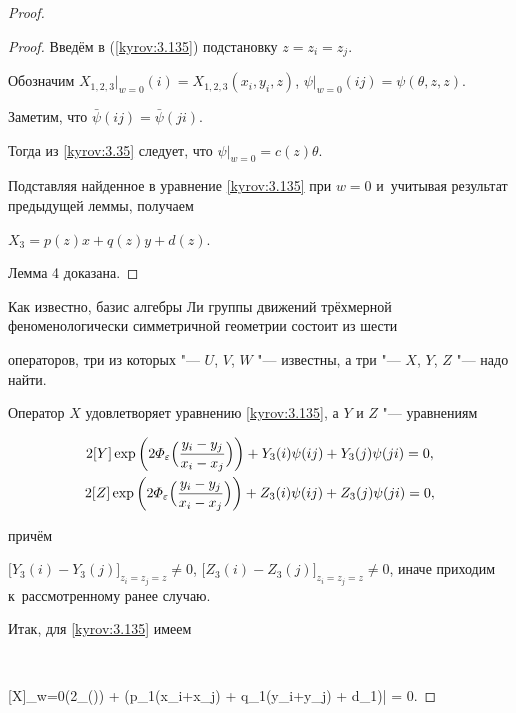 \begin{proof}
\begin{proof}
Введём  в (\ref{kyrov:3.135}) подстановку $z=z_i=z_j$.

Обозначим $X_{1,2,3}\bigr|_{w=0}(i) = X_{1,2,3}(x_i,y_i,z)$, $\psi\bigr|_{w=0}(ij) = \psi(\theta,z,z)$. 

Заметим, что $\bar{\psi}(ij) = \bar{\psi}(ji)$. 

Тогда из \eqref{kyrov:3.35} следует, что $\psi\bigr|_{w=0} = c(z)\theta$. 

Подставляя найденное в уравнение \eqref{kyrov:3.135} при $w=0$ и~учитывая результат предыдущей леммы, получаем 

$X_3 = p(z)x + q(z) y + d(z).$

Лемма 4 доказана.

\end{proof}



\smallskip



Как известно, базис алгебры Ли группы движений трёхмерной феноменологически симметричной геометрии состоит из шести

операторов, три из которых "--- $U$, $V$, $W$ "--- известны, а три "--- $X$, $Y$, $Z$ "--- надо найти. 

Оператор $X$ удовлетворяет уравнению \eqref{kyrov:3.135}, а $Y$ и $Z$ "--- уравнениям 

\begin{gather}

\label{kyrov:2.231}

 2[Y]\exp \left({2\varPhi_{\varepsilon}\Bigl(\frac{y_i-y_j}{x_i-x_j}\Bigr)}\right) + Y_3(i)\psi(ij) + Y_3(j)\psi(ji) = 0, \\

\label{kyrov:2.241}

2[Z]\exp\left({2\varPhi_{\varepsilon}\Bigl(\frac{y_i-y_j}{x_i-x_j}\Bigr)}\right)+ Z_3(i)\psi(ij) + Z_3(j)\psi(ji) = 0,

\end{gather}

причём

$\bigl[Y_3(i) - Y_3(j)\bigr]_{z_i=z_j=z}\ne0$, $\bigl[Z_3(i) - Z_3(j)\bigr]_{z_i=z_j=z}\ne0$, иначе приходим к~рассмотренному ранее  случаю.



Итак, для \eqref{kyrov:3.135} имеем

$$

[X]_{w=0}\exp \left({2\varPhi_{\varepsilon}\Bigl(\Bigr)}\right) + (p_1(x_i+x_j) + q_1(y_i+y_j) + d_1)\bar{\theta} = 0.


\end{proof}
